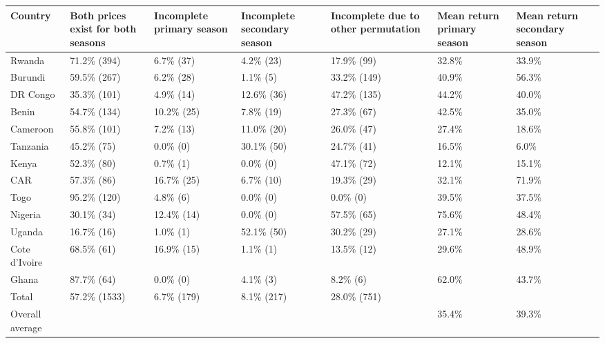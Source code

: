 \begin{table}[ht]
\centering
\begin{tabular}{lllllll}
  \hline
Country & Both prices exist for both seasons & Incomplete primary season & Incomplete secondary season & Incomplete due to other permutation & Mean return primary season & Mean return secondary season \\ 
  \hline
Rwanda & 71.2\%  (394) & 6.7\%  (37) & 4.2\%  (23) & 17.9\%  (99) & 32.8\% & 33.9\% \\ 
  Burundi & 59.5\%  (267) & 6.2\%  (28) & 1.1\%   (5) & 33.2\% (149) & 40.9\% & 56.3\% \\ 
  DR Congo & 35.3\%  (101) & 4.9\%  (14) & 12.6\%  (36) & 47.2\% (135) & 44.2\% & 40.0\% \\ 
  Benin & 54.7\%  (134) & 10.2\%  (25) & 7.8\%  (19) & 27.3\%  (67) & 42.5\% & 35.0\% \\ 
  Cameroon & 55.8\%  (101) & 7.2\%  (13) & 11.0\%  (20) & 26.0\%  (47) & 27.4\% & 18.6\% \\ 
  Tanzania & 45.2\%   (75) & 0.0\%   (0) & 30.1\%  (50) & 24.7\%  (41) & 16.5\% & 6.0\% \\ 
  Kenya & 52.3\%   (80) & 0.7\%   (1) & 0.0\%   (0) & 47.1\%  (72) & 12.1\% & 15.1\% \\ 
  CAR & 57.3\%   (86) & 16.7\%  (25) & 6.7\%  (10) & 19.3\%  (29) & 32.1\% & 71.9\% \\ 
  Togo & 95.2\%  (120) & 4.8\%   (6) & 0.0\%   (0) & 0.0\%   (0) & 39.5\% & 37.5\% \\ 
  Nigeria & 30.1\%   (34) & 12.4\%  (14) & 0.0\%   (0) & 57.5\%  (65) & 75.6\% & 48.4\% \\ 
  Uganda & 16.7\%   (16) & 1.0\%   (1) & 52.1\%  (50) & 30.2\%  (29) & 27.1\% & 28.6\% \\ 
  Cote d'Ivoire & 68.5\%   (61) & 16.9\%  (15) & 1.1\%   (1) & 13.5\%  (12) & 29.6\% & 48.9\% \\ 
  Ghana & 87.7\%   (64) & 0.0\%   (0) & 4.1\%   (3) & 8.2\%   (6) & 62.0\% & 43.7\% \\ 
  Total & 57.2\% (1533) & 6.7\% (179) & 8.1\% (217) & 28.0\% (751) &  &  \\ 
  Overall average &  &  &  &  & 35.4\% & 39.3\% \\ 
   \hline
\end{tabular}
\end{table}

